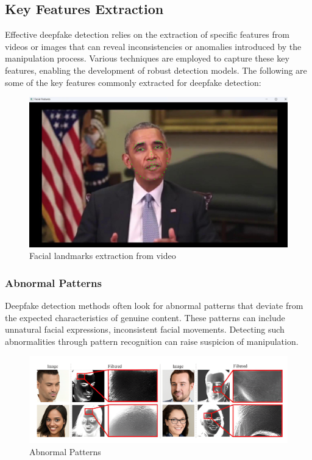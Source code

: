 \subsection{Key Features Extraction}

Effective deepfake detection relies on the extraction of specific features from videos or images that can reveal inconsistencies or anomalies introduced by the manipulation process. Various techniques are employed to capture these key features, enabling the development of robust detection models. The following are some of the key features commonly extracted for deepfake detection:

\begin{figure}[htbp]
    \centering
    \includegraphics[width= 5in ]{img/featureshighlight.jpg}
    \caption{Facial landmarks extraction from video}
\end{figure}
\subsubsection{Abnormal Patterns}

Deepfake detection methods often look for abnormal patterns that deviate from the expected characteristics of genuine content. These patterns can include unnatural facial expressions, inconsistent facial movements. Detecting such abnormalities through pattern recognition can raise suspicion of manipulation.
\begin{figure}[htbp]
    \centering
    \includegraphics[width=5in]{img/abnormal_pattern.png}
    \caption{Abnormal Patterns}
\end{figure}

